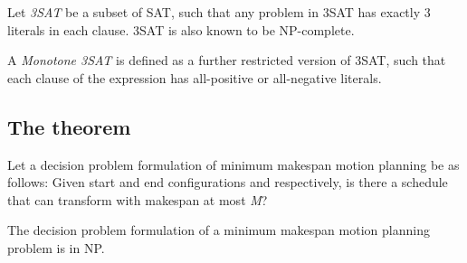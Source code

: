 \begin{definition}
	Let \emph{3SAT} be a subset of SAT, such that any problem in 3SAT has exactly 3 literals in each clause. 3SAT is also known to be NP-complete.
\end{definition}

\begin{definition}
	A \emph{Monotone 3SAT} is defined as a further restricted version of 3SAT, such that each clause of the expression has all-positive or all-negative literals. 
\end{definition}



\subsection{The theorem}


Let a decision problem formulation of minimum makespan motion planning be as follows: Given start and end configurations  and  respectively, is there a schedule that can transform  with makespan at most \emph{M}? 

\begin{lemma}\label{lemma:np}
	The decision problem formulation of a minimum makespan motion planning problem is in NP.
\end{lemma}

